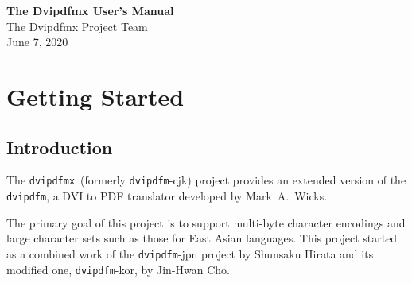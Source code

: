 \documentclass[a4paper,xetex,oneside]{book}
\newcommand{\dvipdfm}{\texttt{dvipdfm}}
\newcommand{\dvipdfmx}{\texttt{dvipdfmx}}
\begin{document}
\begin{titlepage}
  \begin{raggedleft}
    {\Huge\bfseries The Dvipdfmx User's Manual}\\[\baselineskip]
    \Large The Dvipdfmx Project Team\\
    June 7, 2020\par
  \end{raggedleft}
\end{titlepage}

\tableofcontents

\chapter{Getting Started}

\section{Introduction}

The \dvipdfmx\ (formerly \dvipdfm-cjk) project provides an extended version of
the \dvipdfm, a DVI to PDF translator developed by Mark~A.~Wicks.

The primary goal of this project is to support multi-byte character encodings
and large character sets such as those for East Asian languages.
This project started as a combined work of the \dvipdfm-jpn project by
Shunsaku Hirata and its modified one, \dvipdfm-kor, by Jin-Hwan Cho.
\end{document}
